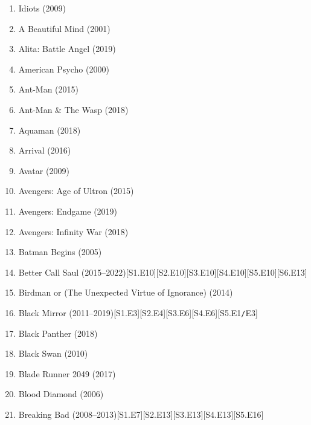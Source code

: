 \documentclass{article}
\begin{document}
\begin{enumerate}
	\item { Idiots} (2009)
	\item {\sc A Beautiful Mind} (2001)
	\item {\sc Alita: Battle Angel} (2019)
	\item {\sc American Psycho} (2000)
	\item {\sc Ant-Man} (2015)
	\item {\sc Ant-Man \& The Wasp} (2018)
	\item {\sc Aquaman} (2018)
	\item {\sc Arrival} (2016)
	\item {\sc Avatar} (2009)
	\item {\sc Avengers: Age of Ultron} (2015)
	\item {\sc Avengers: Endgame} (2019)
	\item {\sc Avengers: Infinity War} (2018)
	\item {\sc Batman Begins} (2005)
	\item {\sc Better Call Saul} (2015--2022)\hfill[S1.E10][S2.E10][S3.E10][S4.E10][S5.E10][S6.E13]
	\item {\sc Birdman or (The Unexpected Virtue of Ignorance)} (2014)
	\item Black Mirror (2011--2019)\hfill[S1.E3][S2.E4][S3.E6][S4.E6][S5.E1{\tt/}E3]
	\item {\sc Black Panther} (2018)
	\item {\sc Black Swan} (2010)
	\item {\sc Blade Runner 2049} (2017)
	\item {\sc Blood Diamond} (2006)
	\item {\sc Breaking Bad} (2008--2013)\hfill[S1.E7][S2.E13][S3.E13][S4.E13][S5.E16]
	

\end{enumerate}
\end{document}
